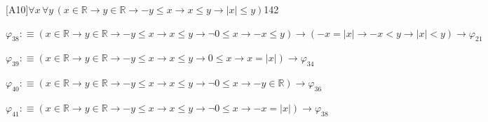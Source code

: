 \begin{fullproof}{[A10]}{$\forall x\,\forall y\,(x \in \mathbb{R} \to y \in \mathbb{R} \to -y \leq x \to x \leq y \to \lvert x \rvert \leq y)$}{142}
\begin{abbrevlist}
\item $\varphi_{38} :\equiv (x \in \mathbb{R} \to y \in \mathbb{R} \to -y \leq x \to x \leq y \to \neg 0 \leq x \to -x \leq y) \to (-x = \lvert x \rvert \to -x < y \to \lvert x \rvert < y) \to \varphi_{21}$
\item $\varphi_{39} :\equiv (x \in \mathbb{R} \to y \in \mathbb{R} \to -y \leq x \to x \leq y \to 0 \leq x \to x = \lvert x \rvert) \to \varphi_{34}$
\item $\varphi_{40} :\equiv (x \in \mathbb{R} \to y \in \mathbb{R} \to -y \leq x \to x \leq y \to \neg 0 \leq x \to -y \in \mathbb{R}) \to \varphi_{36}$
\item $\varphi_{41} :\equiv (x \in \mathbb{R} \to y \in \mathbb{R} \to -y \leq x \to x \leq y \to \neg 0 \leq x \to -x = \lvert x \rvert) \to \varphi_{38}$
\end{abbrevlist}
\end{fullproof}
